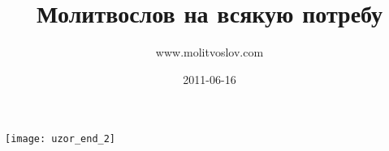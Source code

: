 \documentclass[11pt,oneside]{book}
\title{Молитвослов на всякую потребу}
\author{www.molitvoslov.com}
\date{2011-06-16}
\newcommand{\ornament}{uzor_begin_2}
\begin{document}





\begin{center}\texttt{[image: uzor\_end\_2]}\end{center}

\renewcommand{\ornament}{uzor_begin_5}




\end{document}
